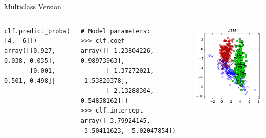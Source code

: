 \documentclass[10pt, aspectratio=169]{beamer} %
\begin{document}
\begin{frame}[fragile]{Multiclass Version }
\begin{columns}[onlytextwidth]
\begin{columns}[onlytextwidth]
\begin{lstlisting}
clf.predict_proba([[1,-1], [4, -6]])
array([[0.927, 0.038, 0.035],
       [0.001, 0.501, 0.498]]
\end{lstlisting}
\begin{lstlisting}
# Model parameters:
>>> clf.coef_
array([[-1.23804226,  0.98973963],
       [-1.37272021, -1.53820378],
       [ 2.13288304,  0.54858162]])
>>> clf.intercept_
array([ 3.79924145, -3.50411623, -5.02047854])			
\end{lstlisting}
\end{columns}
\vspace*{-1cm}
\begin{center}
	\includegraphics[width=\textwidth]{LR_3classes_data.pdf}\\

\end{center}
\end{columns}
\end{frame}
\end{document}
